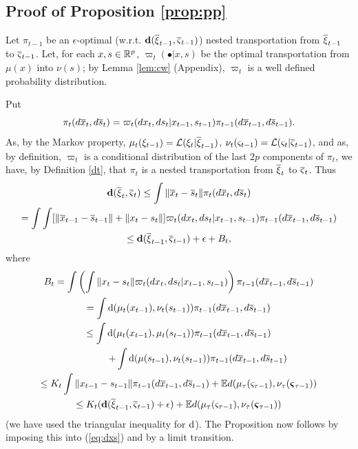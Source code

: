 \documentclass{article}              %
\begin{document}
\subsection{Proof of Proposition \ref{prop:pp}}

\label{app:pp}

Let $\pi_{t-1}$ be an $\epsilon$-optimal (w.r.t. $\mathbf{d}(\overline{\xi}_{t-1},\overline{\varsigma}_{t-1})$)
nested transportation from $\overline{\xi}_{t-1}$ to $\overline{\varsigma}_{t-1}$. Let,
for each $x,s\in\mathbb{R}^{p}$, $\varpi_{t}(\bullet|x,s)$ be the optimal
transportation from $\mu(x)$ into $\nu(s)$; by Lemma \ref{lem:cw} (Appendix),
$\varpi_{t}$ is a well defined probability distribution.

Put
\[
\pi_{t}(d\overline{x}_{t},d\overline{s}_{t})=\varpi_{t}(dx_{t},ds_{t}|x_{t-1},s_{t-1})\pi_{t-1}(d\overline{x}_{t-1},d\overline{s}_{t-1}).
\]
As, by the Markov property, $\mu_{t}(\xi_{t-1})=\mathcal{L}(\xi_{t}|\overline{\xi}_{t-1})$,
$\nu_{t}(\varsigma_{t-1})=\mathcal{L}(\varsigma_{t}|\overline{\varsigma}_{t-1})$,
and as, by definition, $\varpi_{t}$ is a conditional distribution
of the last $2p$ components of $\pi_{t}$, we have, by Definition
\ref{dt}, that $\pi_{t}$ is a nested transportation from $\overline{\xi}_{t}$
to $\overline{\varsigma}_{t}$. Thus 
\begin{multline}
\mathbf{d}(\overline{\xi}_{t},\overline{\varsigma}_{t})\leq\int\|\overline{x}_{t}-\overline{s}_{t}\|\pi_{t}(d\overline{x}_{t},d\overline{s}_{t})\\
=\int\int[\|\overline{x}_{t-1}-\overline{s}_{t-1}\|+\|x_{t}-s_{t}\|]\varpi_{t}(dx_{t},ds_{t}|x_{t-1},s_{t-1})\pi_{t-1}(d\overline{x}_{t-1},d\overline{s}_{t-1})\\
\leq\mathbf{d}(\overline{\xi}_{t-1},\overline{\varsigma}_{t-1})+\epsilon+B_{t},\label{eq:dxs}
\end{multline}
where
\begin{multline*}
B_{t}=\int\left(\int\|x{}_{t}-s_{t}\|\varpi_{t}(dx_{t},ds_{t}|x_{t-1},s_{t-1})\right)\pi_{t-1}(d\overline{x}_{t-1},d\overline{s}_{t-1})\\
=\mathrm{\int d}(\mu_{t}(x_{t-1}),\nu_{t}(s_{t-1}))\pi_{t-1}(d\overline{x}_{t-1},d\overline{s}_{t-1})\\
\leq\int\mathrm{d}(\mu_{t}(x_{t-1}),\mu_{t}(s_{t-1}))\pi_{t-1}(d\overline{x}_{t-1},d\overline{s}_{t-1})\\
\qquad\qquad+\int\mathrm{d}(\mu(s_{t-1}),\nu_{t}(s_{t-1}))\pi_{t-1}(d\overline{x}_{t-1},d\overline{s}_{t-1})\\
\leq K_{t}\int\|x_{t-1}-s_{t-1}\|\pi_{t-1}(d\overline{x}_{t-1},d\overline{s}_{t-1})+\mathbb{E} d(\mu_{\tau}(\varsigma_{\text{\ensuremath{\tau}}-1}),\nu_{\tau}(\boldsymbol{\varsigma}_{\tau-1}))\\
\leq K_{t}(\mathrm{\mathbf{d}}(\overline{\xi}_{t-1},\overline{\varsigma}_{t-1})+\epsilon)+\mathbb{E} d(\mu_{\tau}(\varsigma_{\text{\ensuremath{\tau}}-1}),\nu_{\tau}(\boldsymbol{\varsigma}_{\tau-1}))
\end{multline*}
(we have used the triangular inequality for $\mathrm{d}$). The Proposition
now follows by imposing this into (\ref{eq:dxs}) and by a limit transition. 
\end{document}
